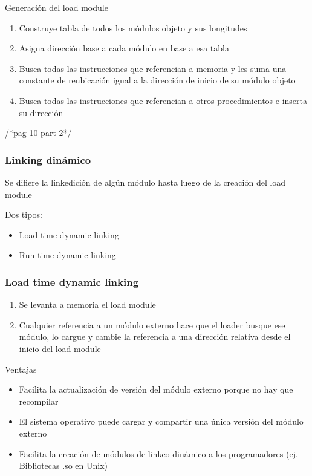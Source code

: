 		Generación del load module
			\begin{enumerate}
			\item Construye tabla de todos los módulos objeto y sus longitudes
			\item Asigna dirección base a cada módulo en base a esa tabla
			\item Busca todas las instrucciones que referencian a memoria y les suma una constante de reubicación igual a la dirección de inicio de su módulo objeto
			\item Busca todas las instrucciones que referencian a otros procedimientos e inserta su dirección
			\end{enumerate}

		/*pag 10 part 2*/

	\subsubsection{Linking dinámico}
		Se difiere la linkedición de algún módulo hasta luego de la creación del load module
		
		Dos tipos:
			\begin{itemize}
			\item Load time dynamic linking
			\item Run time dynamic linking
			\end{itemize}

		\subsubsection{Load time dynamic linking}
			\begin{enumerate}
			\item Se levanta a memoria el load module
			\item Cualquier referencia a un módulo externo hace que el loader busque ese módulo, lo cargue y cambie la referencia a una dirección relativa desde el inicio del load module
			\end{enumerate}
			
			Ventajas
			\begin{itemize}
			\item Facilita la actualización de versión del módulo externo porque no hay que recompilar
			\item El sistema operativo puede cargar y compartir una única versión del módulo externo
			\item Facilita la creación de módulos de linkeo dinámico a los programadores (ej. Bibliotecas .so en Unix)
			\end{itemize}

